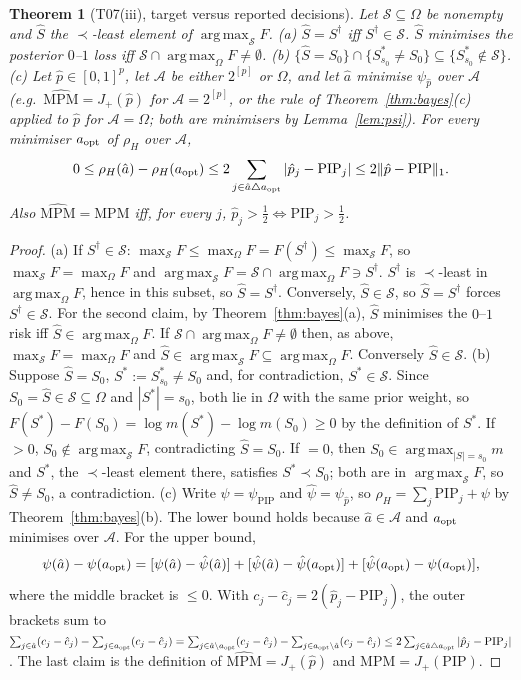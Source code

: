 \documentclass[11pt]{article}
\newtheorem{theorem}{Theorem}[section]
\theoremstyle{remark}
\newcommand{\PIP}{\mathrm{PIP}}
\newcommand{\MPM}{\mathrm{MPM}}
\newcommand{\sS}{\mathcal S}
\DeclareMathOperator*{\argmax}{arg\,max}
\begin{document}
\begin{theorem}[T07(iii), target versus reported decisions]\label{thm:reported}
Let $\sS\subseteq\Omega$ be nonempty and $\hat S$ the $\prec$-least element of $\argmax_\sS F$.
(a) $\hat S=S^\dagger$ iff $S^\dagger\in\sS$. $\hat S$ minimises the posterior $0$--$1$ loss iff $\sS\cap\argmax_\Omega F\ne\emptyset$.
(b) $\{\hat S=S_0\}\cap\{S^*_{s_0}\ne S_0\}\subseteq\{S^*_{s_0}\notin\sS\}$.
(c) Let $\hat p\in[0,1]^p$, let $\mathcal A$ be either $2^{[p]}$ or $\Omega$, and let $\hat a$ minimise $\psi_{\hat p}$ over $\mathcal A$ (e.g.\ $\widehat{\MPM}=J_+(\hat p)$ for $\mathcal A=2^{[p]}$, or the rule of Theorem~\ref{thm:bayes}(c) applied to $\hat p$ for $\mathcal A=\Omega$; both are minimisers by Lemma~\ref{lem:psi}). For every minimiser $a_{\rm opt}$ of $\rho_H$ over $\mathcal A$,
\[
0\le\rho_H(\hat a)-\rho_H(a_{\rm opt})\le2\sum_{j\in\hat a\triangle a_{\rm opt}}|\hat p_j-\PIP_j|\le2\|\hat p-\PIP\|_1 .
\]
Also $\widehat{\MPM}=\MPM$ iff, for every $j$, $\hat p_j>\tfrac12\Leftrightarrow\PIP_j>\tfrac12$.
\end{theorem}
\begin{proof}
(a) If $S^\dagger\in\sS$: $\max_\sS F\le\max_\Omega F=F(S^\dagger)\le\max_\sS F$, so $\max_\sS F=\max_\Omega F$ and $\argmax_\sS F=\sS\cap\argmax_\Omega F\ni S^\dagger$. $S^\dagger$ is $\prec$-least in $\argmax_\Omega F$, hence in this subset, so $\hat S=S^\dagger$. Conversely, $\hat S\in\sS$, so $\hat S=S^\dagger$ forces $S^\dagger\in\sS$. For the second claim, by Theorem~\ref{thm:bayes}(a), $\hat S$ minimises the $0$--$1$ risk iff $\hat S\in\argmax_\Omega F$. If $\sS\cap\argmax_\Omega F\ne\emptyset$ then, as above, $\max_\sS F=\max_\Omega F$ and $\hat S\in\argmax_\sS F\subseteq\argmax_\Omega F$. Conversely $\hat S\in\sS$.
(b) Suppose $\hat S=S_0$, $S^*:=S^*_{s_0}\ne S_0$ and, for contradiction, $S^*\in\sS$. Since $S_0=\hat S\in\sS\subseteq\Omega$ and $|S^*|=s_0$, both lie in $\Omega$ with the same prior weight, so $F(S^*)-F(S_0)=\log m(S^*)-\log m(S_0)\ge0$ by the definition of $S^*$. If $>0$, $S_0\notin\argmax_\sS F$, contradicting $\hat S=S_0$. If $=0$, then $S_0\in\argmax_{|S|=s_0}m$ and $S^*$, the $\prec$-least element there, satisfies $S^*\prec S_0$; both are in $\argmax_\sS F$, so $\hat S\ne S_0$, a contradiction.
(c) Write $\psi=\psi_{\PIP}$ and $\hat\psi=\psi_{\hat p}$, so $\rho_H=\sum_j\PIP_j+\psi$ by Theorem~\ref{thm:bayes}(b). The lower bound holds because $\hat a\in\mathcal A$ and $a_{\rm opt}$ minimises over $\mathcal A$. For the upper bound,
\[
\psi(\hat a)-\psi(a_{\rm opt})=[\psi(\hat a)-\hat\psi(\hat a)]+[\hat\psi(\hat a)-\hat\psi(a_{\rm opt})]+[\hat\psi(a_{\rm opt})-\psi(a_{\rm opt})] ,
\]
where the middle bracket is $\le0$. With $c_j-\hat c_j=2(\hat p_j-\PIP_j)$, the outer brackets sum to $\sum_{j\in\hat a}(c_j-\hat c_j)-\sum_{j\in a_{\rm opt}}(c_j-\hat c_j)=\sum_{j\in\hat a\setminus a_{\rm opt}}(c_j-\hat c_j)-\sum_{j\in a_{\rm opt}\setminus\hat a}(c_j-\hat c_j)\le2\sum_{j\in\hat a\triangle a_{\rm opt}}|\hat p_j-\PIP_j|$. The last claim is the definition of $\widehat{\MPM}=J_+(\hat p)$ and $\MPM=J_+(\PIP)$.
\end{proof}
\end{document}
